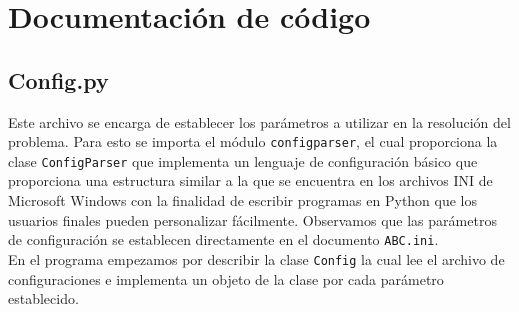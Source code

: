\documentclass{article}
\begin{document}
\begin{itemize}
\end{itemize}


\section{Documentaci\'on de c\'odigo}
\subsection*{Config.py}

Este archivo se encarga de establecer los parámetros a utilizar en la resolución del problema. Para esto se importa el módulo \texttt{configparser}, el cual proporciona la clase \texttt{ConfigParser} que implementa un lenguaje de configuración básico que proporciona una estructura similar a la que se encuentra en los archivos INI de Microsoft Windows con la finalidad de escribir programas en Python que los usuarios finales pueden personalizar fácilmente. Observamos que las parámetros de configuración se establecen directamente en el documento \texttt{ABC.ini}. \\

En el programa empezamos por describir la clase \texttt{Config} la cual lee el archivo de configuraciones e implementa un objeto de la clase por cada parámetro establecido.
\end{document}
